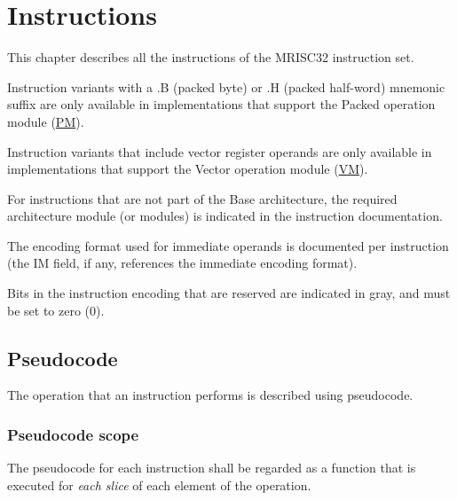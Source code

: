%

\chapter{Instructions}

This chapter describes all the instructions of the MRISC32 instruction set.

Instruction variants with a .B (packed byte) or .H (packed half-word) mnemonic
suffix are only available in implementations that support the Packed operation
module (\hyperref[module:PM]{PM}).

Instruction variants that include vector register operands are only available
in implementations that support the Vector operation module
(\hyperref[module:VM]{VM}).

For instructions that are not part of the Base architecture, the required
architecture module (or modules) is indicated in the instruction documentation.

The encoding format used for immediate operands is documented per instruction
(the IM field, if any, references the immediate encoding format).

Bits in the instruction encoding that are reserved are indicated in gray, and
must be set to zero (0).

\section{Pseudocode}

The operation that an instruction performs is described using pseudocode.

\subsection{Pseudocode scope}

The pseudocode for each instruction shall be regarded as a function that is
executed for \textit{each slice} of each element of the operation.

